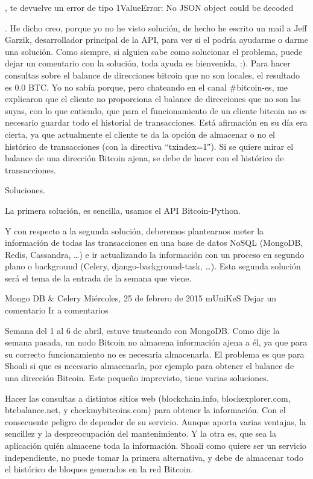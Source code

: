 \documentclass[a4paper, 12pt]{book}
\begin{document}
    , te devuelve un error de tipo
    1ValueError: No JSON object could be decoded

    . He dicho creo, porque yo no he visto solución, de hecho he escrito un mail a Jeff Garzik, desarrollador principal de la API, para ver si el podría ayudarme o darme una solución. Como siempre, si alguien sabe como solucionar el problema, puede dejar un comentario con la solución, toda ayuda es bienvenida, :).
    Para hacer consultas sobre el balance de direcciones bitcoin que no son locales, el resultado es 0.0 BTC. Yo no sabía porque, pero chateando en el canal #bitcoin-es, me explicaron que el cliente no proporciona el balance de direcciones que no son las suyas, con lo que entiendo, que para el funcionamiento de un cliente bitcoin no es necesario guardar todo el historial de transacciones. Está afirmación en su día era cierta, ya que actualmente el cliente te da la opción de almacenar o no el histórico de transacciones (con la directiva “txindex=1″). Si se quiere mirar el balance de una dirección Bitcoin ajena, se debe de hacer con el histórico de transacciones.

Soluciones.

    La primera solución, es sencilla, usamos el API Bitcoin-Python.

    Y con respecto a la segunda solución, deberemos plantearnos meter la información de todas las transacciones en una base de datos NoSQL (MongoDB, Redis, Cassandra, …) e ir actualizando la información con un proceso en segundo plano o background (Celery, django-background-task, …). Esta segunda solución será el tema de la entrada de la semana que viene.

Mongo DB & Celery
Miércoles, 25 de febrero de 2015 mUniKeS        Dejar un comentario Ir a comentarios

Semana del 1 al 6 de abril, estuve trasteando con MongoDB. Como dije la semana pasada, un nodo Bitcoin no almacena información ajena a él, ya que para su correcto funcionamiento no es necesaria almacenarla. El problema es que para Shoali si que es necesario almacenarla, por ejemplo para obtener el balance de una dirección Bitcoin. Este pequeño imprevisto, tiene varias soluciones.

    Hacer las consultas a distintos sitios web (blockchain.info, blockexplorer.com, btcbalance.net, y checkmybitcoins.com) para obtener la información. Con el consecuente peligro de depender de su servicio. Aunque aporta varias ventajas, la sencillez y la despreocupación del mantenimiento.
    Y la otra es,  que sea la aplicación quién almacene toda la información. Shoali como quiere ser un servicio independiente, no puede tomar la primera alternativa, y debe de almacenar todo el histórico de bloques generados en la red Bitcoin.
\end{document}
